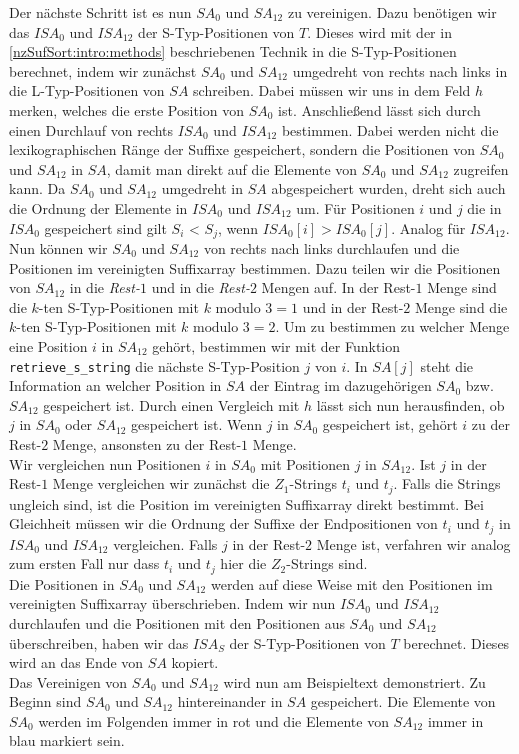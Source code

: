 Der nächste Schritt ist es nun $SA_0$ und $SA_{12}$ zu vereinigen. Dazu benötigen wir das $ISA_0$ und $ISA_{12}$ der S-Typ-Positionen von $T$. Dieses wird mit der in \cref{nzSufSort:intro:methods} beschriebenen Technik in die S-Typ-Positionen berechnet, indem wir zunächst $SA_0$ und $SA_{12}$ umgedreht von rechts nach links in die L-Typ-Positionen von $SA$ schreiben. Dabei müssen wir uns in dem Feld $h$ merken, welches die erste Position von $SA_0$ ist. Anschließend lässt sich durch einen Durchlauf von rechts $ISA_0$ und $ISA_{12}$ bestimmen. Dabei werden nicht die lexikographischen Ränge der Suffixe gespeichert, sondern die Positionen von $SA_0$ und $SA_{12}$ in $SA$, damit man direkt auf die Elemente von $SA_0$ und $SA_{12}$ zugreifen kann. Da $SA_0$ und $SA_{12}$ umgedreht in $SA$ abgespeichert wurden, dreht sich auch die Ordnung der Elemente in $ISA_0$ und $ISA_{12}$ um. Für Positionen $i$ und $j$ die in $ISA_0$ gespeichert sind gilt $S_i$ < $S_j$, wenn $ISA_0[i] > ISA_0[j]$. Analog für $ISA_{12}$. \\
Nun können wir $SA_0$ und $SA_{12}$ von rechts nach links durchlaufen und die Positionen im vereinigten Suffixarray bestimmen. Dazu teilen wir die Positionen von $SA_{12}$ in die \textit{Rest-$1$} und in die \textit{Rest-$2$} Mengen auf. In der Rest-$1$ Menge sind die $k$-ten S-Typ-Positionen mit $k \text{ modulo } 3 = 1$ und in der Rest-$2$ Menge sind die $k$-ten S-Typ-Positionen mit $k \text{ modulo } 3 = 2$. Um zu bestimmen zu welcher Menge eine Position $i$ in $SA_{12}$ gehört, bestimmen wir mit der Funktion \texttt{retrieve\_s\_string} die nächste S-Typ-Position $j$ von $i$. In $SA[j]$ steht die Information an welcher Position in $SA$ der Eintrag im dazugehörigen $SA_0$ bzw. $SA_{12}$ gespeichert ist. Durch einen Vergleich mit $h$ lässt sich nun herausfinden, ob $j$ in $SA_0$ oder $SA_{12}$ gespeichert ist. Wenn $j$ in $SA_0$ gespeichert ist, gehört $i$ zu der Rest-$2$ Menge, ansonsten zu der Rest-$1$ Menge. \\ 
Wir vergleichen nun Positionen $i$ in $SA_0$ mit Positionen $j$ in $SA_{12}$. Ist $j$ in der Rest-$1$ Menge vergleichen wir zunächst die $Z_1$-Strings $t_i$ und $t_j$. Falls die Strings ungleich sind, ist die Position im vereinigten Suffixarray direkt bestimmt. Bei Gleichheit müssen wir die Ordnung der Suffixe der Endpositionen von $t_i$ und $t_j$ in $ISA_0$ und $ISA_{12}$ vergleichen. Falls $j$ in der Rest-$2$ Menge ist, verfahren wir analog zum ersten Fall nur dass $t_i$ und $t_j$ hier die $Z_2$-Strings sind. \\
Die Positionen in $SA_0$ und $SA_{12}$ werden auf diese Weise mit den Positionen im vereinigten Suffixarray überschrieben. Indem wir nun $ISA_0$ und $ISA_{12}$ durchlaufen und die Positionen mit den Positionen aus $SA_0$ und $SA_{12}$ überschreiben, haben wir das $ISA_S$ der S-Typ-Positionen von $T$ berechnet. Dieses wird an das Ende von $SA$ kopiert. \\
Das Vereinigen von $SA_0$ und $SA_{12}$ wird nun am Beispieltext demonstriert. Zu Beginn sind $SA_0$ und $SA_{12}$ hintereinander in $SA$ gespeichert. Die Elemente von $SA_0$ werden im Folgenden immer in rot und die Elemente von $SA_{12}$ immer in blau markiert sein. 

